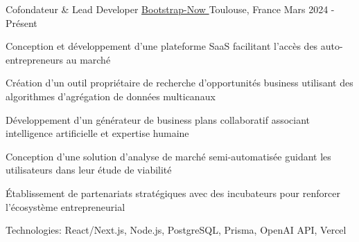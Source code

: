 \begin{cventries}
\cventry
{Cofondateur \& Lead Developer} %
{\href{https://www.bootstrap-now.com}{Bootstrap-Now {\tiny\textcolor{black}{\faExternalLink}}}}
{Toulouse, France} %
{Mars 2024 - Présent} %
{ %
\begin{cvitems}
\item {Conception et développement d'une plateforme SaaS facilitant l'accès des auto-entrepreneurs au marché}
\item {Création d'un outil propriétaire de recherche d'opportunités business utilisant des algorithmes d'agrégation de données multicanaux}
\item {Développement d'un générateur de business plans collaboratif associant intelligence artificielle et expertise humaine}
\item {Conception d'une solution d'analyse de marché semi-automatisée guidant les utilisateurs dans leur étude de viabilité}
\item {Établissement de partenariats stratégiques avec des incubateurs pour renforcer l'écosystème entrepreneurial}
\item {Technologies: React/Next.js, Node.js, PostgreSQL, Prisma, OpenAI API, Vercel}
\end{cvitems}
}
\vspace{1.5em}



\end{cventries}
